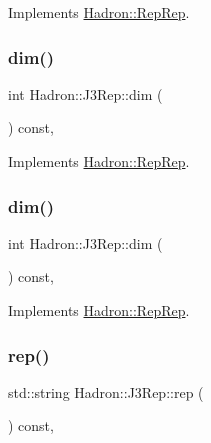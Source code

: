 Implements \mbox{\hyperlink{structHadron_1_1RepRep_a92c8802e5ed7afd7da43ccfd5b7cd92b}{Hadron\+::\+Rep\+Rep}}.

\mbox{\label{structHadron_1_1J3Rep_ab2c01ddb7d42f7ce131a9e07f0a6703d}} 
\subsubsection{\texorpdfstring{dim()}{dim()}\hspace{0.1cm}{\footnotesize\ttfamily [4/5]}}
{\footnotesize\ttfamily int Hadron\+::\+J3\+Rep\+::dim (\begin{DoxyParamCaption}{ }\end{DoxyParamCaption}) const\hspace{0.3cm}{\ttfamily [inline]}, {\ttfamily [virtual]}}



Implements \mbox{\hyperlink{structHadron_1_1RepRep_a92c8802e5ed7afd7da43ccfd5b7cd92b}{Hadron\+::\+Rep\+Rep}}.

\mbox{\label{structHadron_1_1J3Rep_ab2c01ddb7d42f7ce131a9e07f0a6703d}} 
\subsubsection{\texorpdfstring{dim()}{dim()}\hspace{0.1cm}{\footnotesize\ttfamily [5/5]}}
{\footnotesize\ttfamily int Hadron\+::\+J3\+Rep\+::dim (\begin{DoxyParamCaption}{ }\end{DoxyParamCaption}) const\hspace{0.3cm}{\ttfamily [inline]}, {\ttfamily [virtual]}}



Implements \mbox{\hyperlink{structHadron_1_1RepRep_a92c8802e5ed7afd7da43ccfd5b7cd92b}{Hadron\+::\+Rep\+Rep}}.

\mbox{\label{structHadron_1_1J3Rep_ab890e5844d6c221d555b2049711e89a6}} 
\subsubsection{\texorpdfstring{rep()}{rep()}\hspace{0.1cm}{\footnotesize\ttfamily [1/5]}}
{\footnotesize\ttfamily std\+::string Hadron\+::\+J3\+Rep\+::rep (\begin{DoxyParamCaption}{ }\end{DoxyParamCaption}) const\hspace{0.3cm}{\ttfamily [inline]}, {\ttfamily [virtual]}}



